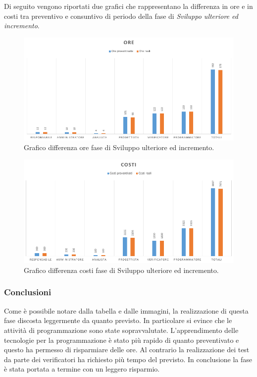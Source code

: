 \documentclass[a4paper]{article}
\begin{document}
				Di seguito vengono riportati due grafici che rappresentano la differenza in ore e in costi tra preventivo e consuntivo di periodo della 
				fase di \emph{Sviluppo ulteriore ed incremento}.
				\begin{figure}[H]
					\centering
					\includegraphics[width=\textwidth]{diff_h_in}
					\caption{Grafico differenza ore fase di Sviluppo ulteriore ed incremento.}
				\end{figure}
				\begin{figure}[H]
					\centering
					\includegraphics[width=\textwidth]{diff_c_in}
					\caption{Grafico differenza costi fase di Sviluppo ulteriore ed incremento.}
				\end{figure}
				
					\subsubsection{Conclusioni}		
						Come è possibile notare dalla tabella e dalle immagini, la realizzazione di questa fase discosta leggermente da quanto previsto. In particolare si evince che le attività di programmazione sono state sopravvalutate. L'apprendimento delle tecnologie per la programmazione è stato più rapido di quanto preventivato e questo ha permesso di risparmiare delle ore.
Al contrario la realizzazione dei test da parte dei verificatori ha richiesto più tempo del previsto. In conclusione la fase è stata portata a termine con un leggero risparmio.
				
\end{document}

